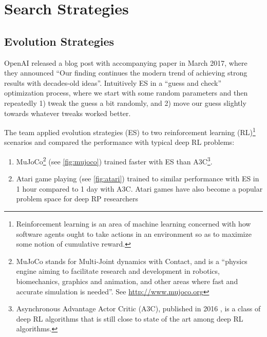 
\chapter{Search Strategies}
\section{Evolution Strategies}
OpenAI released a blog post \cite{Karpathy} with accompanying paper \cite{Salimans2017} in March 2017, where they announced ``Our finding continues the modern trend of achieving strong results with decades-old ideas''. Intuitively ES in a “guess and check” optimization process, where we start with some random parameters and then repeatedly 1) tweak the guess a bit randomly, and 2) move our guess slightly towards whatever tweaks worked better.

The team applied evolution strategies (ES) to two reinforcement learning (RL)\footnote{Reinforcement learning is an area of machine learning concerned with how software agents ought to take actions in an environment so as to maximize some notion of cumulative reward.} scenarios and compared the performance with typical deep RL problems:

\begin{enumerate}
    \item MuJoCo\footnote{MuJoCo stands for Multi-Joint dynamics with Contact, and is a ``physics engine aiming to facilitate research and development in robotics, biomechanics, graphics and animation, and other areas where fast and accurate simulation is needed''. See \url{http://www.mujoco.org}} (see \cref{fig:mujoco}) trained faster with ES than A3C\footnote{Asynchronous Advantage Actor Critic (A3C), published in 2016 \cite{Mnih2016}, is a class of deep RL algorithms that is still close to state of the art among deep RL algorithms.}.
    \item Atari game playing (see \cref{fig:atari}) trained to similar performance with ES in 1 hour compared to 1 day with A3C. Atari games have also become a popular problem space for deep RP researchers
\end{enumerate}

